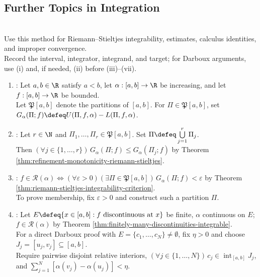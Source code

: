 \subsection{Further Topics in Integration}

\begin{proofmethod} \label{meth:riemann-stieltjes-proof-patterns} \\
Use this method for Riemann--Stieltjes integrability, estimates, calculus identities, and improper convergence.\\
Record the interval, integrator, integrand, and target; for Darboux arguments, use (i) and, if needed, (ii) before (iii)--(vii).
\begin{enumerate}[label=(\roman*)]
\setlength{\itemsep}{0pt}
\item {}: Let $a,b\in\R$ satisfy $a<b$, let $\alpha:[a,b]\to\R$ be increasing, and let $f:[a,b]\to\R$ be bounded.\\
Let $\mathfrak{P}[a,b]$ denote the partitions of $[a,b]$. For $\Pi\in\mathfrak{P}[a,b]$, set $G_\alpha(\Pi;f)\defeq U(\Pi,f,\alpha)-L(\Pi,f,\alpha)$.
\item {}: Let $r\in\N$ and $\Pi_1,\ldots,\Pi_r\in\mathfrak{P}[a,b]$. Set $\Pi\defeq\bigcup\limits_{j=1}^{r}\Pi_j$.\\
Then $(\forall j\in\{1,\ldots,r\})\,G_\alpha(\Pi;f)\leq G_\alpha(\Pi_j;f)$ by Theorem \ref{thm:refinement-monotonicity-riemann-stieltjes}.
\item {}: $f\in\mathcal{R}(\alpha)\Longleftrightarrow(\forall\varepsilon>0)(\exists\Pi\in\mathfrak{P}[a,b])\,G_\alpha(\Pi;f)<\varepsilon$ by Theorem \ref{thm:riemann-stieltjes-integrability-criterion}.\\
To prove membership, fix $\varepsilon>0$ and construct such a partition $\Pi$.
\item {}: Let $E\defeq\{x\in[a,b]:f\text{ discontinuous at }x\}$ be finite, $\alpha$ continuous on $E$; $f\in\mathcal{R}(\alpha)$ by Theorem \ref{thm:finitely-many-discontinuities-integrable}.\\
For a direct Darboux proof with $E=\{c_1,\ldots,c_N\}\neq\emptyset$, fix $\eta>0$ and choose $J_j=[u_j,v_j]\subseteq[a,b]$.\\
Require pairwise disjoint relative interiors, $(\forall j\in\{1,\ldots,N\})\,c_j\in\operatorname{int}_{[a,b]}J_j$, and $\sum\limits_{j=1}^{N}[\alpha(v_j)-\alpha(u_j)]<\eta$.\\

\end{enumerate}
\end{proofmethod}
